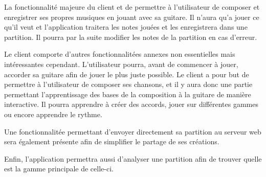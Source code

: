 La fonctionnalité majeure du client et de permettre à l'utilisateur de composer et enregistrer ses propres musiques en jouant avec sa guitare. Il n'aura qu'a jouer ce qu'il veut et l'application traitera les notes jouées et les enregistrera dans une partition. Il pourra par la suite modifier les notes de la partition en cas d'erreur. 

Le client comporte d'autres fonctionnalitées annexes non essentielles mais intéressantes cependant.
L'utilisateur pourra, avant de commencer à jouer, accorder sa guitare afin de jouer le plus juste possible.
Le client a pour but de permettre à l'utilisateur de composer ses chansons, et il y aura donc une partie permettant l'apprentissage des bases de la composition à la guitare de manière interactive. Il pourra apprendre à créer des accords, jouer sur différentes gammes ou encore apprendre le rythme.

Une fonctionnalitée permettant d'envoyer directement sa partition au serveur web sera également présente afin de simplifier le partage de ses créations.

Enfin, l'application permettra aussi d'analyser une partition afin de trouver quelle est la gamme principale de celle-ci.